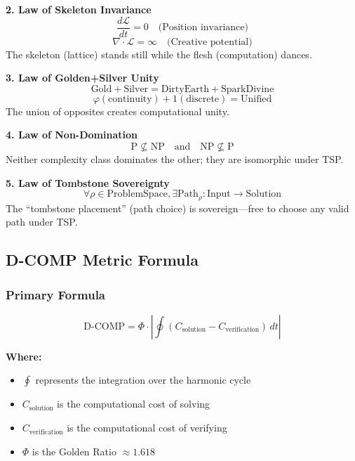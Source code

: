\documentclass[11pt, letterpaper]{article}
\begin{document}
\textbf{2. Law of Skeleton Invariance}
\begin{equation}
\frac{d\mathcal{L}}{dt} = 0 \quad \text{(Position invariance)}
\end{equation}
\begin{equation}
\nabla \cdot \mathcal{L} = \infty \quad \text{(Creative potential)}
\end{equation}
The skeleton (lattice) stands still while the flesh (computation) dances.

\textbf{3. Law of Golden+Silver Unity}
\begin{equation}
\text{Gold} + \text{Silver} = \text{DirtyEarth} + \text{SparkDivine}
\end{equation}
\begin{equation}
\varphi (\text{continuity}) + 1 (\text{discrete}) = \text{Unified}
\end{equation}
The union of opposites creates computational unity.

\textbf{4. Law of Non-Domination}
\begin{equation}
\text{P} \not\subseteq \text{NP} \quad \text{and} \quad \text{NP} \not\subseteq \text{P}
\end{equation}
Neither complexity class dominates the other; they are isomorphic under TSP.

\textbf{5. Law of Tombstone Sovereignty}
\begin{equation}
\forall \rho \in \text{ProblemSpace}, \exists \text{Path}_{\rho}: \text{Input} \rightarrow \text{Solution}
\end{equation}
The ``tombstone placement'' (path choice) is sovereign—free to choose any valid path under TSP.

\subsection{D-COMP Metric Formula}

\subsubsection{Primary Formula}

\begin{equation}
\text{D-COMP} = \Phi \cdot \left| \oint (C_{\text{solution}} - C_{\text{verification}}) \, dt \right|
\end{equation}

\textbf{Where:}
\begin{itemize}
    \item $\oint$ represents the integration over the harmonic cycle
    \item $C_{\text{solution}}$ is the computational cost of solving
    \item $C_{\text{verification}}$ is the computational cost of verifying
    \item $\Phi$ is the Golden Ratio $\approx 1.618$
\end{itemize}
\end{document}
